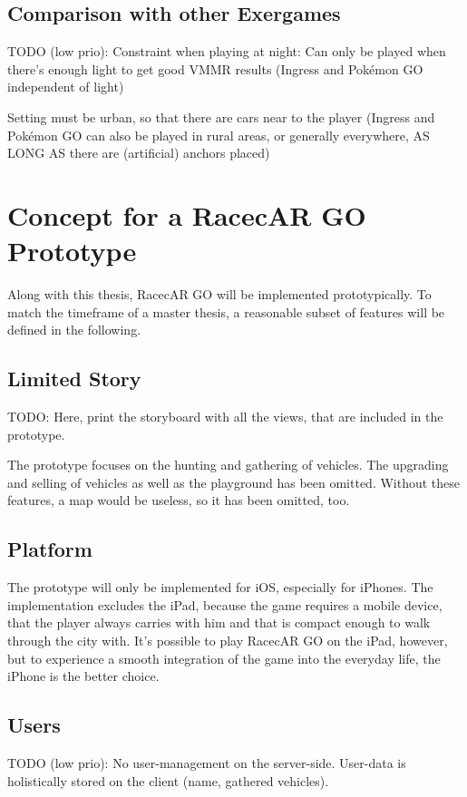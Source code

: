 \subsection{Comparison with other Exergames}
TODO (low prio):
Constraint when playing at night: Can only be played when there’s enough light to get good VMMR results (Ingress and Pokémon GO independent of light)

Setting must be urban, so that there are cars near to the player (Ingress and Pokémon GO can also be played in rural areas, or generally everywhere, AS LONG AS there are (artificial) anchors placed)


\section{Concept for a RacecAR GO Prototype}
Along with this thesis, RacecAR GO will be implemented prototypically. To match the timeframe of a master thesis, a reasonable subset of features will be defined in the following.

\subsection{Limited Story}
TODO: Here, print the storyboard with all the views, that are included in the prototype.

The prototype focuses on the hunting and gathering of vehicles. The upgrading and selling of vehicles as well as the playground has been omitted. Without these features, a map would be useless, so it has been omitted, too.

\subsection{Platform}
The prototype will only be implemented for iOS, especially for iPhones. The implementation excludes the iPad, because the game requires a mobile device, that the player always carries with him and that is compact enough to walk through the city with. It’s possible to play RacecAR GO on the iPad, however, but to experience a smooth integration of the game into the everyday life, the iPhone is the better choice.

\subsection{Users}
TODO (low prio):
No user-management on the server-side. User-data is holistically stored on the client (name, gathered vehicles).

